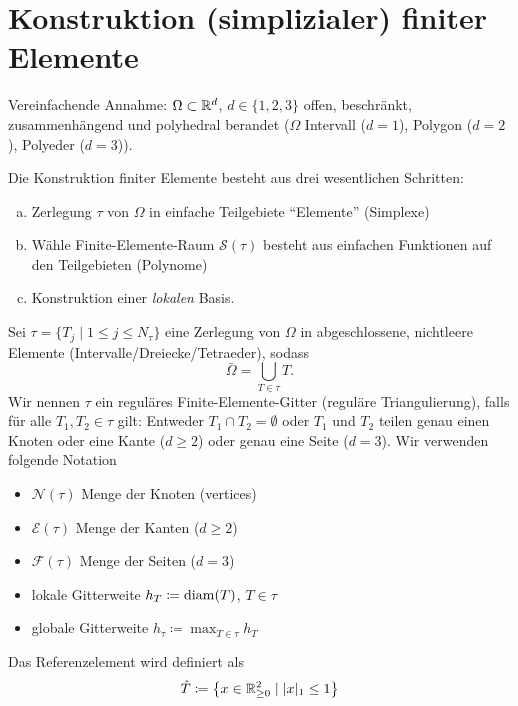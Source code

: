 \documentclass[../skript.tex]{subfiles}
\begin{document}
\section{Konstruktion (simplizialer) finiter Elemente} %
\label{sec:c2e3}
Vereinfachende Annahme: $\Omega \subset \mathbb{R}^d$, $d \in \{ 1, 2, 3 \}$ offen, beschränkt, zusammenhängend und polyhedral berandet ($\Omega$ Intervall ($d = 1$), Polygon ($d = 2$), Polyeder ($d = 3$)).

Die Konstruktion finiter Elemente besteht aus drei wesentlichen Schritten:
\begin{enumerate}[(a)]
\item Zerlegung $\tau$ von $\Omega$ in einfache Teilgebiete ``Elemente'' (Simplexe)
\item Wähle Finite-Elemente-Raum $\mathcal{S}(\tau)$ besteht aus einfachen Funktionen auf den Teilgebieten (Polynome)
\item Konstruktion einer \emph{lokalen} Basis.
\end{enumerate}
\begin{definition} %
\label{def:c2e3s1}
Sei $\tau = \{ T_j \mid 1 \leq j \leq N_\tau \}$ eine Zerlegung von $\Omega$ in abgeschlossene, nichtleere Elemente (Intervalle\slash{}Dreiecke\slash{}Tetraeder), sodass
\[
	\bar{\Omega} = \bigcup_{T \in \tau} T.
\]
Wir nennen $\tau$ ein reguläres Finite-Elemente-Gitter (reguläre Triangulierung), falls für alle $T_1, T_2 \in \tau$ gilt:\tabularnewline
Entweder $T_1 \cap T_2 = \emptyset$ oder $T_1$ und $T_2$ teilen genau einen Knoten oder eine Kante ($d \geq 2$) oder genau eine Seite ($d = 3$).
Wir verwenden folgende Notation
\begin{itemize}
\item $\mathcal{N}(\tau)$ Menge der Knoten (vertices)
\item $\mathcal{E}(\tau)$ Menge der Kanten ($d \geq 2$)
\item $\mathcal{F}(\tau)$ Menge der Seiten ($d = 3$)
\item lokale Gitterweite $h_T \coloneqq \operatorname*{diam}(T)$, $T \in \tau$
\item globale Gitterweite $h_\tau \coloneqq \max_{T \in \tau} h_T$
\end{itemize}
\end{definition}
\begin{definition}[Referenzelement] %
\label{def:c2e3s2}
Das Referenzelement wird definiert als
\[
	\hat{T} \coloneqq \left\{ x \in \mathbb{R}_{\geq 0}^2 \mid |x|_1 \leq 1 \right\}
\]
\end{definition}
\end{document}
